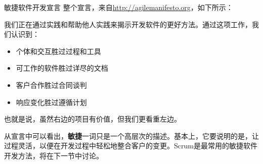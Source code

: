 \begin{myTip}{敏捷软件开发宣言}
整个宣言，来自\url{http://agilemanifesto.org}，如下所示：

我们正在通过实践和帮助他人实践来揭示开发软件的更好方法。通过这项工作，我们认识到：

\begin{itemize}
\item
个体和交互胜过过程和工具

\item
可工作的软件胜过详尽的文档

\item
客户合作胜过合同谈判

\item
响应变化胜过遵循计划
\end{itemize}

也就是说，虽然右边的项目有价值，但我们更看重左边。
\end{myTip}

从宣言中可以看出，\textbf{敏捷}一词只是一个高层次的描述。基本上，它要说明的是，让过程灵活，以便在开发过程中轻松地整合客户的变更。Scrum是最常用的敏捷软件开发方法，将在下一节中讨论。


